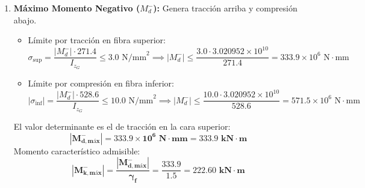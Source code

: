 {\begin{enumerate}[label=\textbf{c.\arabic*)}]
        \item \textbf{Máximo Momento Negativo ($M_d^-$):} Genera tracción arriba y compresión abajo.
              \begin{itemize}
                  \item Límite por tracción en fibra superior:
                        \begin{equation}
                            \sigma_{\text{sup}} = \frac{|M_d^-| \cdot 271.4}{I_{z_G}} \le 3.0\text{ N/mm}^2 \implies |M_d^-| \le \frac{3.0 \cdot 3.020952 \times 10^{10}}{271.4} = 333.9 \times 10^6\text{ N}\cdot\text{mm}
                        \end{equation}
                  \item Límite por compresión en fibra inferior:
                        \begin{equation}
                            |\sigma_{\text{inf}}| = \frac{|M_d^-| \cdot 528.6}{I_{z_G}} \le 10.0\text{ N/mm}^2 \implies |M_d^-| \le \frac{10.0 \cdot 3.020952 \times 10^{10}}{528.6} = 571.5 \times 10^6\text{ N}\cdot\text{mm}
                        \end{equation}
              \end{itemize}
              El valor determinante es el de tracción en la cara superior:
              \begin{equation}
                  \mathbf{|M_{d,\text{máx}}^-| = 333.9 \times 10^6\text{ N}\cdot\text{mm} = 333.9\text{ kN}\cdot\text{m}}
              \end{equation}
              Momento característico admisible:
              \begin{equation}
                  \mathbf{|M_{k,\text{máx}}^-| = \frac{|M_{d,\text{máx}}^-|}{\gamma_f} = \frac{333.9}{1.5} = \mathbf{222.60\text{ kN}\cdot\text{m}}}
              \end{equation}
    \end{enumerate}
}


